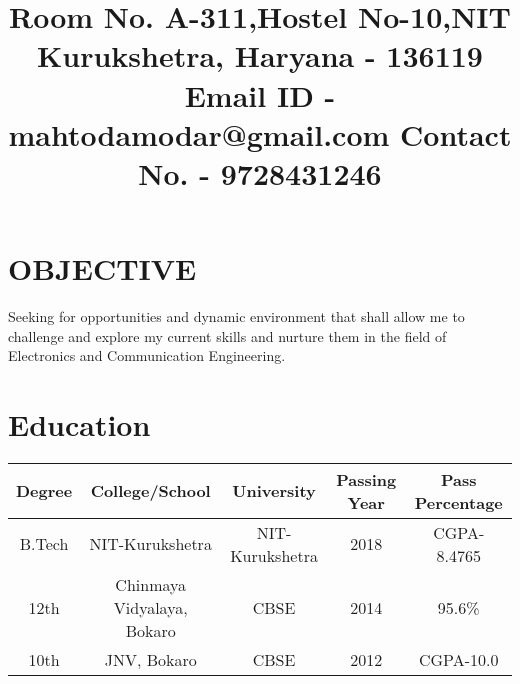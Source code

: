 \documentclass[11pt,a4paper,sans]{moderncv}
\title{   \newline Room No.  A-311,\newline Hostel No-10,\newline NIT Kurukshetra, \newline Haryana - 136119 \newline Email ID - mahtodamodar@gmail.com \newline Contact No. - 9728431246}
\begin{document}
\makecvtitle
\section{OBJECTIVE}
Seeking for opportunities and dynamic environment that shall allow me to challenge and explore my current skills and nurture them in the field of Electronics and Communication Engineering.
\section{Education}
\begin{center}
\begin{tabular}{ |c|c|c|c|c| } 
\hline
Degree & College/School & University & Passing Year & Pass Percentage \\
\hline
\multirow {1}{4em}{B.Tech} & { NIT-Kurukshetra } & { NIT-Kurukshetra } & {2018} & {CGPA-8.4765} \\ 
\hline
\multirow {1}{4em}{12th} & { Chinmaya Vidyalaya, Bokaro } & { CBSE } & {2014} & {95.6\%}\\
\hline
\multirow {1}{4em}{10th} & { JNV, Bokaro } & { CBSE } & {2012} & {CGPA-10.0}\\
\hline
\end{tabular}
\end{center}

\clearpage
\end{document}
